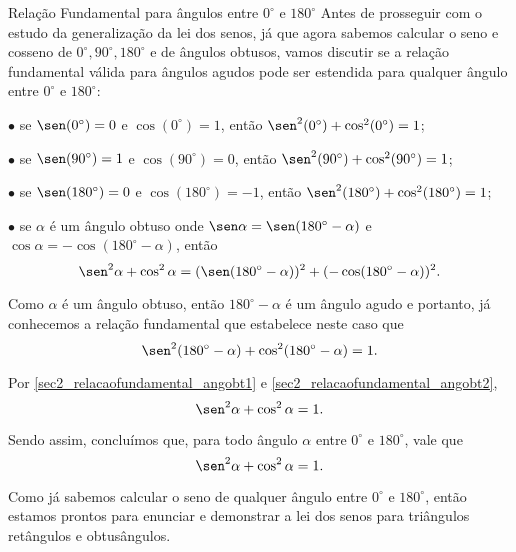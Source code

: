 \begin{observationtitle}{Relação Fundamental para ângulos entre $0^\circ$ e $180^\circ$}
Antes de prosseguir com o estudo da generalização da lei dos senos, já que agora sabemos calcular o seno e cosseno de $0^\circ, 90^\circ, 180^\circ$ e de ângulos obtusos, vamos discutir se a relação fundamental válida para ângulos agudos pode ser estendida para qualquer ângulo entre $0^\circ$ e $180^\circ$:

$\bullet$ se $\sen(0^\circ)= 0$ e $\cos(0^\circ)= 1$, então $\sen^2(0^\circ)+\cos^2(0^\circ)=1$;

$\bullet$ se $\sen(90^\circ)= 1$ e $\cos(90^\circ)= 0$, então $\sen^2(90^\circ)+\cos^2(90^\circ)=1$;

$\bullet$ se $\sen(180^\circ)= 0$ e $\cos(180^\circ)= -1$, então $\sen^2(180^\circ)+\cos^2(180^\circ)=1$;

$\bullet$ se $\alpha$ é um ângulo obtuso onde  $\sen\alpha=\sen(180^\circ-\alpha)$ e $\cos\alpha=-\cos(180^\circ-\alpha)$, então
\begin{equation}
  \sen^2\alpha+\cos^2\alpha=(\sen(180^\circ-\alpha))^2+(-\cos(180^\circ-\alpha))^2. \label{sec2_relacaofundamental_angobt1}  
\end{equation}

Como $\alpha$ é um ângulo obtuso, então $180^\circ-\alpha$ é um ângulo agudo e portanto, já conhecemos a relação fundamental que estabelece neste caso que
\begin{equation}
  \sen^2(180^\circ-\alpha)+\cos^2(180^\circ-\alpha)=1. \label{sec2_relacaofundamental_angobt2}  
\end{equation}

Por \eqref{sec2_relacaofundamental_angobt1} e \eqref{sec2_relacaofundamental_angobt2}, 
$$\sen^2\alpha+\cos^2\alpha=1.$$

Sendo assim, concluímos que, para todo ângulo $\alpha$ entre $0^\circ$ e $180^\circ$, vale que
$$\sen^2\alpha+\cos^2\alpha=1.$$
\end{observationtitle}

Como já sabemos calcular o seno de qualquer ângulo entre $0^\circ$ e $180^\circ$, então estamos prontos para  enunciar e demonstrar a lei dos senos para triângulos retângulos e obtusângulos. 

